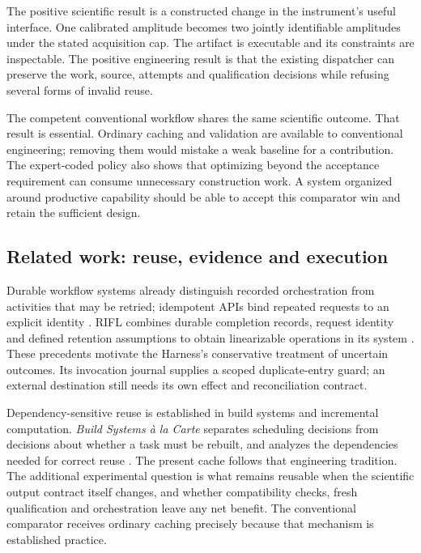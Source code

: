 \documentclass[11pt]{article}
\begin{document}
The positive scientific result is a constructed change in the instrument's useful interface. One calibrated amplitude becomes two jointly identifiable amplitudes under the stated acquisition cap. The artifact is executable and its constraints are inspectable. The positive engineering result is that the existing dispatcher can preserve the work, source, attempts and qualification decisions while refusing several forms of invalid reuse.

The competent conventional workflow shares the same scientific outcome. That result is essential. Ordinary caching and validation are available to conventional engineering; removing them would mistake a weak baseline for a contribution. The expert-coded policy also shows that optimizing beyond the acceptance requirement can consume unnecessary construction work. A system organized around productive capability should be able to accept this comparator win and retain the sufficient design.

\subsection{Related work: reuse, evidence and execution}

Durable workflow systems already distinguish recorded orchestration from activities that may be retried; idempotent APIs bind repeated requests to an explicit identity \cite{temporal,awsidempotency}. RIFL combines durable completion records, request identity and defined retention assumptions to obtain linearizable operations in its system \cite{lee_rifl2015}. These precedents motivate the Harness's conservative treatment of uncertain outcomes. Its invocation journal supplies a scoped duplicate-entry guard; an external destination still needs its own effect and reconciliation contract.

Dependency-sensitive reuse is established in build systems and incremental computation. \emph{Build Systems \`a la Carte} separates scheduling decisions from decisions about whether a task must be rebuilt, and analyzes the dependencies needed for correct reuse \cite{buildsystems}. The present cache follows that engineering tradition. The additional experimental question is what remains reusable when the scientific output contract itself changes, and whether compatibility checks, fresh qualification and orchestration leave any net benefit. The conventional comparator receives ordinary caching precisely because that mechanism is established practice.
\end{document}
